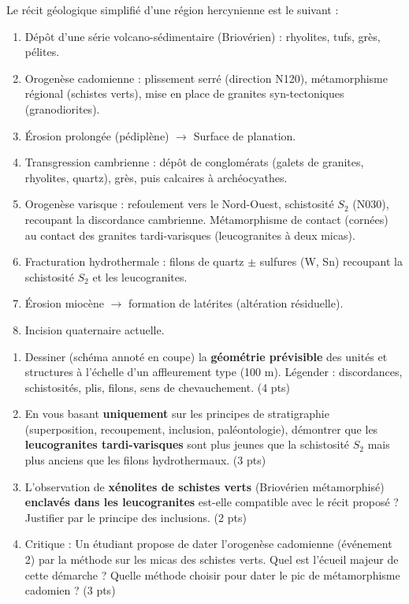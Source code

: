 \documentclass[11pt]{article}
\begin{document}
\begin{exercice}
Le récit géologique simplifié d'une région hercynienne est le suivant :
\begin{enumerate}
\item Dépôt d'une série volcano-sédimentaire (Briovérien) : rhyolites, tufs, grès, pélites.
\item Orogenèse cadomienne : plissement serré (direction N120), métamorphisme régional (schistes verts), mise en place de granites syn-tectoniques (granodiorites).
\item Érosion prolongée (pédiplène) $\rightarrow$ Surface de planation.
\item Transgression cambrienne : dépôt de conglomérats (galets de granites, rhyolites, quartz), grès, puis calcaires à archéocyathes.
\item Orogenèse varisque : refoulement vers le Nord-Ouest, schistosité $S_2$ (N030), recoupant la discordance cambrienne. Métamorphisme de contact (cornées) au contact des granites tardi-varisques (leucogranites à deux micas).
\item Fracturation hydrothermale : filons de quartz $\pm$ sulfures (W, Sn) recoupant la schistosité $S_2$ et les leucogranites.
\item Érosion miocène $\rightarrow$ formation de latérites (altération résiduelle).
\item Incision quaternaire actuelle.
\end{enumerate}

\begin{enumerate}
\item Dessiner (schéma annoté en coupe) la \textbf{géométrie prévisible} des unités et structures à l'échelle d'un affleurement type (100 m). Légender : discordances, schistosités, plis, filons, sens de chevauchement. \hfill (4 pts)
\item En vous basant \textbf{uniquement} sur les principes de stratigraphie (superposition, recoupement, inclusion, paléontologie), démontrer que les \textbf{leucogranites tardi-varisques} sont plus jeunes que la schistosité $S_2$ mais plus anciens que les filons hydrothermaux. \hfill (3 pts)
\item L'observation de \textbf{xénolites de schistes verts} (Briovérien métamorphisé) \textbf{enclavés dans les leucogranites} est-elle compatible avec le récit proposé ? Justifier par le principe des inclusions. \hfill (2 pts)
\item Critique : Un étudiant propose de dater l'orogenèse cadomienne (événement 2) par la méthode  sur les micas des schistes verts. Quel est l'écueil majeur de cette démarche ? Quelle méthode choisir pour dater le pic de métamorphisme cadomien ? \hfill (3 pts)
\end{enumerate}
\end{exercice}
\end{document}
